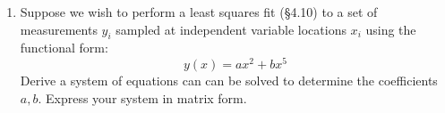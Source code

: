 \documentclass{article}
\begin{document}
\begin{enumerate}
    \pagebreak
    
   \item Suppose we wish to perform a least squares fit (\S 4.10) to a set of measurements $y_i$ sampled at independent variable locations $x_i$ using the functional form:  
    \begin{equation}
      y(x) = a x^2 + b x^5
    \end{equation}
    Derive a system of equations can can be solved to determine the coefficients $a,b$.  Express your system in matrix form.  
    
\end{enumerate}
\end{document}
